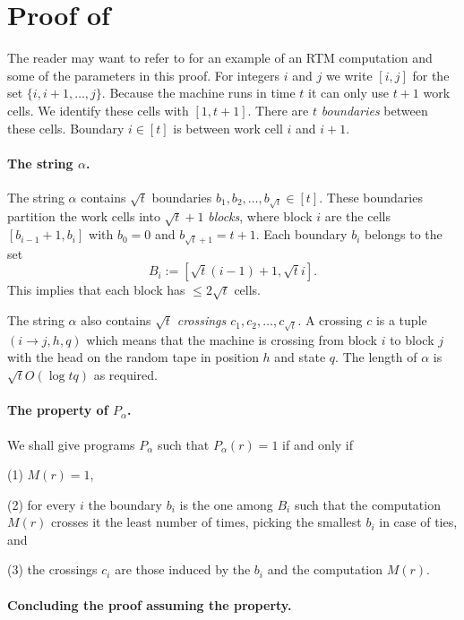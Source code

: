 \section{Proof of  \label{sec:Proof-of-simu}}
%

The reader may want to refer to 
for an example of an RTM computation and some of the parameters in
this proof. For integers $i$ and $j$ we write $[i,j]$ for the set
$\{i,i+1,\ldots,j\}$. Because the machine runs in time $t$ it can
only use $t+1$ work cells. We identify these cells with $[1,t+1]$.
There are $t$ \emph{boundaries} between these cells. Boundary $i\in[t]$
is between work cell $i$ and $i+1$.

\paragraph{The string $\alpha$.}

The string $\alpha$ contains $\sqrt{t}$ boundaries $b_{1},b_{2},\ldots,b_{\sqrt{t}}\in[t]$.
These boundaries partition the work cells into $\sqrt{t}+1$\emph{
blocks}, where block $i$ are the cells $[b_{i-1}+1,b_{i}]$ with
$b_{0}=0$ and $b_{\sqrt{t}+1}=t+1$. Each boundary $b_{i}$ belongs
to the set 
\[
B_{i}:=[\sqrt{t}(i-1)+1,\sqrt{t}i].
\]
This implies that each block has $\le2\sqrt{t}$ cells.

The string $\alpha$ also contains $\sqrt{t}$ \emph{crossings $c_{1},c_{2},\ldots,c_{\sqrt{t}}$.}
A crossing $c$ is a tuple $(i\to j,h,q)$ which means that the machine
is crossing from block $i$ to block $j$ with the head on the random
tape in position $h$ and state $q$. The length of $\alpha$ 
is $\sqrt{t}O(\log tq)$ as required.

\paragraph{The property of $P_{\alpha}$.}

We shall give programs $P_{\alpha}$ such that $P_{\alpha}(r)=1$
if and only if

(1) $M(r)=1$,

(2) for every $i$ the boundary $b_{i}$ is the one among $B_{i}$
such that the computation $M(r)$ crosses it the least number of times,
picking the smallest $b_{i}$ in case of ties, and

(3) the crossings $c_{i}$ are those induced by the $b_{i}$ and the
computation $M(r)$.

\paragraph{Concluding the proof assuming the property.}

